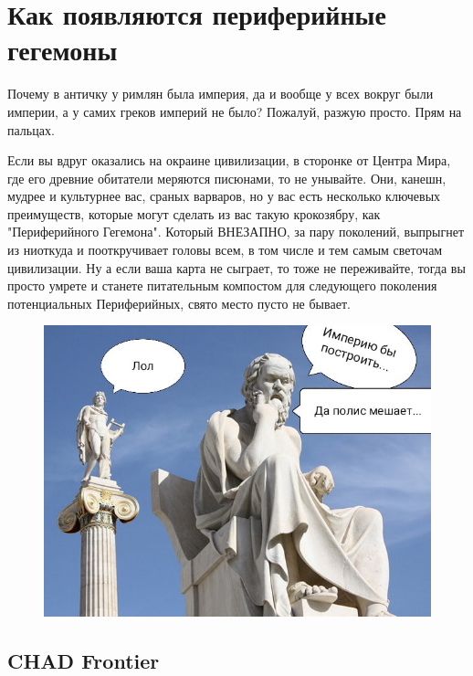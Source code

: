 \chapter{Как появляются периферийные гегемоны}
Почему в античку у римлян была империя, да и вообще у всех вокруг были империи, а у самих греков империй не было? Пожалуй, разжую просто. Прям на пальцах.


Если вы вдруг оказались на окраине цивилизации, в сторонке от Центра Мира, где его древние обитатели меряются писюнами, то не унывайте. Они, канешн, мудрее и культурнее вас, сраных варваров, но у вас есть несколько ключевых преимуществ, которые могут сделать из вас такую крокозябру, как "Периферийного Гегемона". Который ВНЕЗАПНО, за пару поколений, выпрыгнет из ниоткуда и пооткручивает головы всем, в том числе и тем самым светочам цивилизации. Ну а если ваша карта не сыграет, то тоже не переживайте, тогда вы просто умрете и станете питательным компостом для следующего поколения потенциальных Периферийных, свято место пусто не бывает.
\begin{figure}[h!tb]
	\centering\includegraphics[scale=0.6]{regional_hehemons/161365631011485734.png}
	\label{fig:heh1} %
\end{figure}

\section{CHAD Frontier}


